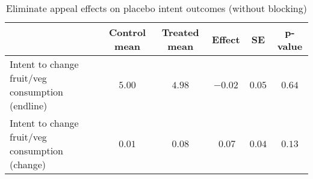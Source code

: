 \begin{table*}[ht]
\caption{Eliminate appeal effects on placebo intent outcomes (without blocking)\label{round}} 
\begin{center}
\begin{tabular}{lccccc}
\hline\hline
\multicolumn{1}{l}{}&\multicolumn{1}{c}{Control mean}&\multicolumn{1}{c}{Treated mean}&\multicolumn{1}{c}{Effect}&\multicolumn{1}{c}{SE}&\multicolumn{1}{c}{p-value}\tabularnewline
\hline
Intent to change fruit/veg consumption (endline)&$5.00$&$4.98$&$-0.02$&$0.05$&$0.64$\tabularnewline
Intent to change fruit/veg consumption (change)&$0.01$&$0.08$&$~0.07$&$0.04$&$0.13$\tabularnewline
\hline
\end{tabular}\end{center}

\end{table*}
